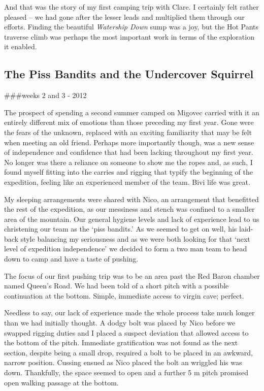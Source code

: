 And that was the story of my first camping trip with Clare. I certainly
felt rather pleased -- we had gone after the lesser leads and multiplied
them through our efforts. Finding the beautiful \emph{Watership Down}
sump was a joy, but the Hot Pants traverse climb was perhaps the most
important work in terms of the exploration it enabled.



\subsection{The Piss Bandits and the Undercover
Squirrel}

\#\#\#weeks 2 and 3 - 2012

The prospect of spending a second summer camped on Migovec carried with
it an entirely different mix of emotions than those preceding my first
year. Gone were the fears of the unknown, replaced with an exciting
familiarity that may be felt when meeting an old friend. Perhaps more
importantly though, was a new sense of independence and confidence that
had been lacking throughout my first year. No longer was there a
reliance on someone to show me the ropes and, as such, I found myself
fitting into the carries and rigging that typify the beginning of the
expedition, feeling like an experienced member of the team. Bivi life
was great.

My sleeping arrangements were shared with Nico, an arrangement that
benefitted the rest of the expedition, as our messiness and stench was
confined to a smaller area of the mountain. Our general hygiene levels
and lack of experience lead to us christening our team as the `piss
bandits.' As we seemed to get on well, his laid-back style balancing my
seriousness and as we were both looking for that `next level of
expedition independence' we decided to form a two man team to head down
to camp and have a taste of pushing.

The focus of our first pushing trip was to be an area past the Red Baron
chamber named Queen's Road. We had been told of a short pitch with a
possible continuation at the bottom. Simple, immediate access to virgin
cave; perfect.

Needless to say, our lack of experience made the whole process take much
longer than we had initially thought. A dodgy bolt was placed by Nico
before we swapped rigging duties and I placed a suspect deviation that
allowed access to the bottom of the pitch. Immediate gratification was
not found as the next section, despite being a small drop, required a
bolt to be placed in an awkward, narrow position. Cussing ensued as Nico
placed the bolt an wriggled his was down. Thankfully, the space seemed
to open and a further 5 m pitch promised open walking passage at the
bottom.

